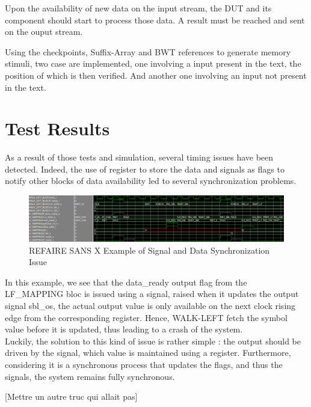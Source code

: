Upon the availability of new data on the input stream, the DUT and its component should start to process those data. A result must be reached and sent on the ouput stream.

Using the checkpoints, Suffix-Array and BWT references to generate memory stimuli, two case are implemented, one involving a input present in the text, the position of which is then verified. And another one involving an input not present in the text.

\section{Test Results}

As a result of those tests and simulation, several timing issues have been detected. Indeed, the use of register to store the data and signals as flags to notify other blocks of data availability led to several synchronization problems. 

\begin{figure}[H]
    \centering
    \hspace*{-10mm}\includegraphics[scale = 0.5]{Figures/lf_timing_issue.png}
    \caption{REFAIRE SANS X Example of Signal and Data Synchronization Issue}
    \label{fig:lf_timing}
\end{figure}

In this example, we see that the \textrm{data\_ready} output flag from the LF\_MAPPING bloc is issued using a signal, raised when it updates the output signal \textrm{sbl\_os}, the actual output value is only available on the next clock rising edge from the corresponding register. Hence, WALK-LEFT fetch the symbol value before it is updated, thus leading to a crash of the system. \\

Luckily, the solution to this kind of issue is rather simple : the output should be driven by the signal, which value is maintained using a register. Furthermore, considering it is a synchronous process that updates the flags, and thus the signals, the system remains fully synchronous.

[Mettre un autre truc qui allait pas]